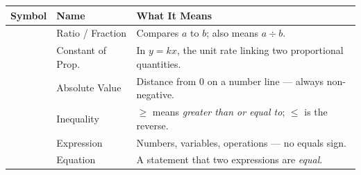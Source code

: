 
\thispagestyle{empty}

{
\sffamily


\begin{center}
\renewcommand{\arraystretch}{1.55}
\begin{tabular}{
    >{\centering\arraybackslash}m{2cm}
    >{\raggedright\arraybackslash}m{3cm}
    >{\raggedright\arraybackslash}m{8.5cm}
}
\toprule
\textbf{\textcolor{funBlueDark}{Symbol}} &
\textbf{\textcolor{funBlueDark}{Name}} &
\textbf{\textcolor{funBlueDark}{What It Means}} \\
\midrule

{\fontsize{18}{20}\selectfont\textcolor{funBlue}{$\frac{a}{b}$}} &
Ratio / Fraction &
Compares $a$ to $b$; also means $a \div b$. \\

{\fontsize{18}{20}\selectfont\textcolor{funGreen}{$k$}} &
Constant of Prop. &
In $y = kx$, the unit rate linking two proportional quantities. \\

{\fontsize{18}{20}\selectfont\textcolor{funPurple}{$|{-}5|=5$}} &
Absolute Value &
Distance from $0$ on a number line — always non-negative. \\

{\fontsize{18}{20}\selectfont\textcolor{funOrange}{$\geq\;\leq$}} &
Inequality &
$\geq$ means \emph{greater than or equal to};\; $\leq$ is the reverse. \\

{\fontsize{18}{20}\selectfont\textcolor{funTeal}{$3x + 7$}} &
Expression &
Numbers, variables, operations — no equals sign. \\

{\fontsize{18}{20}\selectfont\textcolor{funRed}{$2x\!-\!4\!=\!10$}} &
Equation &
A statement that two expressions are \emph{equal}. \\


\end{tabular}
\end{center}}
